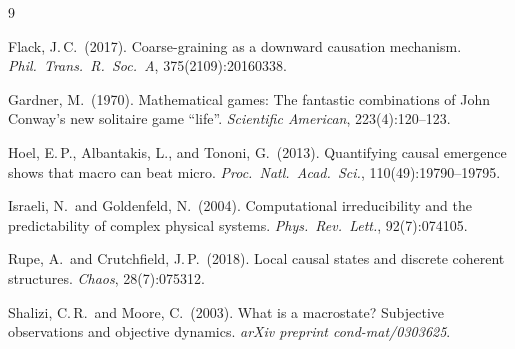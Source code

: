 \documentclass[11pt,a4paper]{article}
\begin{document}

\begin{thebibliography}{9}

Flack, J.\,C.\ (2017).
Coarse-graining as a downward causation mechanism.
\textit{Phil.\ Trans.\ R.\ Soc.\ A}, 375(2109):20160338.

Gardner, M.\ (1970).
Mathematical games: The fantastic combinations of John Conway's new
solitaire game ``life''.
\textit{Scientific American}, 223(4):120--123.

Hoel, E.\,P., Albantakis, L., and Tononi, G.\ (2013).
Quantifying causal emergence shows that macro can beat micro.
\textit{Proc.\ Natl.\ Acad.\ Sci.}, 110(49):19790--19795.

Israeli, N.\ and Goldenfeld, N.\ (2004).
Computational irreducibility and the predictability of complex physical
systems.
\textit{Phys.\ Rev.\ Lett.}, 92(7):074105.

Rupe, A.\ and Crutchfield, J.\,P.\ (2018).
Local causal states and discrete coherent structures.
\textit{Chaos}, 28(7):075312.

Shalizi, C.\,R.\ and Moore, C.\ (2003).
What is a macrostate? Subjective observations and objective dynamics.
\textit{arXiv preprint cond-mat/0303625}.


\end{thebibliography}
\end{document}
